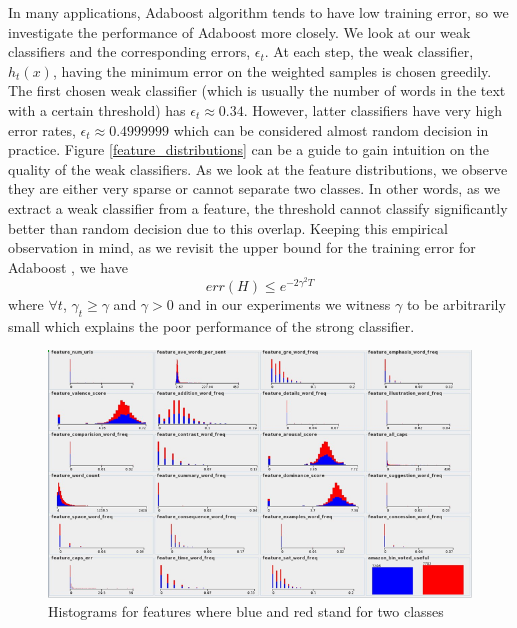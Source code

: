\documentclass[letterpaper]{article}
\begin{document}
In many applications, Adaboost algorithm tends to have low training error, so we
investigate the performance of Adaboost more closely. We look at our weak
classifiers and the corresponding errors, $\epsilon_t$. At each step,
the weak classifier, $h_t(x)$, having the minimum error on the weighted
samples is chosen greedily. The first chosen weak classifier (which is
usually the number of words in the text with a certain threshold) has
$\epsilon_t \approx 0.34$. However, latter classifiers have very high error rates, $\epsilon_t \approx 0.4999999$ which can
be considered almost random decision in practice. Figure
\ref{feature_distributions} can be a guide to gain intuition on the quality of the
weak classifiers. As we look at the feature distributions, we observe
they are either very sparse or cannot separate two classes. In other
words, as we extract a weak classifier from a feature, the threshold
cannot classify significantly better than random decision due to this
overlap. Keeping this empirical observation in mind, as we revisit the upper bound for the training error for Adaboost \cite{adaboost}, we have
\[
err(H) \leq e^{-2\gamma^2 T}
\]
where $\forall t$, $\gamma_t \geq \gamma $ and $\gamma > 0$ and in our
experiments we witness $\gamma$ to be arbitrarily small which explains
the poor performance of the strong classifier.

\begin{figure}[ht]
  \centering
  \includegraphics[scale=.5]{features_distributions}
  \caption{Histograms for features where blue and red stand for two classes}
  \label{fig:dist}
\end{figure}
\end{document}
